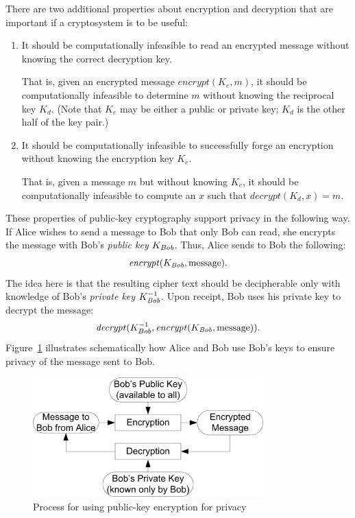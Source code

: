 There are two additional
properties about encryption and decryption that are important if a
cryptosystem is to be useful:
\begin{enumerate}
\item It should be computationally infeasible to read an
  encrypted message without knowing the correct decryption key.  

  That is, given an encrypted message $\mathit{encrypt}(K_e,m)$, it
  should be computationally infeasible to determine $m$ without knowing
  the reciprocal key $K_d$.  (Note that $K_e$ may be either a public or
  private key; $K_d$ is the other half of the key pair.)
\item It should be computationally infeasible to successfully forge an
  encryption without knowing the encryption key $K_e$.

  That is, given a message $m$ but without knowing $K_e$, it should be
  computationally infeasible 
  to compute an $\mathit{x}$ such that $\mathit{decrypt}(K_d,x) = m$.  
\end{enumerate}

These properties of
public-key cryptography support privacy in the following way.  If
Alice wishes to send a message to Bob that only Bob can read, she
encrypts the message with Bob's \emph{public key} $K_{\textit{Bob}}$.
Thus, Alice sends to Bob the following:
\[ \mathit{encrypt}(K_{\textit{Bob}},\mathrm{message}). \]
The idea here is that the resulting cipher text should
be decipherable only with knowledge of Bob's \emph{private key}
$K_{\textit{Bob}}^{-1}$.  Upon receipt, Bob uses his private key to
decrypt the message:
\[
\mathit{decrypt}(K^{-1}_{Bob},\mathit{encrypt}(K_{\textit{Bob}},\mathrm{message})). \] 
Figure~\ref{fig:public key} illustrates schematically how Alice and Bob
use Bob's keys to ensure privacy of the message sent to Bob.


\begin{figure}[tbp]
  \centering
  \includegraphics[width=3.5in]{Figures/pki/publicKey}
  \caption{Process for using public-key encryption for privacy}
  \label{fig:public key}
\end{figure}


